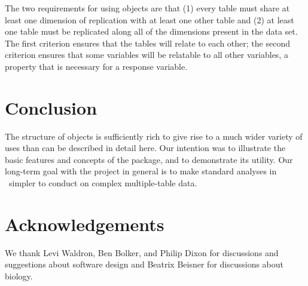 \documentclass[a4paper]{report}
\begin{document}
\begin{article}
The two requirements for using  objects are that (1) every table must share at least one dimension of replication with at least one other table and (2) at least one table must be replicated along all of the dimensions present in the data set.  The first criterion ensures that the tables will relate to each other; the second criterion ensures that some variables will be relatable to all other variables, a property that is necessary for a response variable.

\section{Conclusion}

The structure of  objects is sufficiently rich to give rise to a much wider variety of uses than can be described in detail here.  Our intention was to illustrate the basic features and concepts of the  package, and to demonstrate its utility.  Our long-term goal with the  project in general is to make standard analyses in \R\ simpler to conduct on complex multiple-table data.

\section*{Acknowledgements}
We thank Levi Waldron, Ben Bolker, and Philip Dixon for discussions and suggestions about software design and Beatrix Beisner for discussions about biology.




\end{article}
\end{document}
